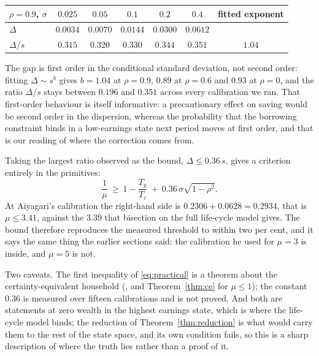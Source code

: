 \begingroup\small
\begin{center}
\begin{tabular}{@{}lcccccc@{}}
\toprule
$\rho=0.9$, $\sigma$ & $0.025$ & $0.05$ & $0.1$ & $0.2$ & $0.4$ & fitted exponent\\
\midrule
$\Delta$ & $0.0034$ & $0.0070$ & $0.0144$ & $0.0300$ & $0.0612$ & \\
$\Delta/s$ & $0.315$ & $0.320$ & $0.330$ & $0.344$ & $0.351$ & $1.04$\\
\bottomrule
\end{tabular}
\end{center}
\endgroup

The gap is first order in the conditional standard deviation, not second order: fitting
$\Delta\sim s^{b}$ gives $b=1.04$ at $\rho=0.9$, $0.89$ at $\rho=0.6$ and $0.93$ at $\rho=0$, and
the ratio $\Delta/s$ stays between $0.196$ and $0.351$ across every calibration we ran. That
first-order behaviour is itself informative: a precautionary effect on saving would be second
order in the dispersion, whereas the probability that the borrowing constraint binds in a
low-earnings state next period moves at first order, and that is our reading of where the
correction comes from.

Taking the largest ratio observed as the bound, $\Delta\le0.36\,s$, gives a criterion entirely in
the primitives:
\begin{equation}\label{eq:practical}
  \frac1\mu\ \ge\ 1-\frac{T_y}{T_c}\ +\ 0.36\,\sigma\sqrt{1-\rho^2}.
\end{equation}
At Aiyagari's calibration the right-hand side is $0.2306+0.0628=0.2934$, that is $\mu\le3.41$,
against the $3.39$ that bisection on the full life-cycle model gives. The bound therefore
reproduces the measured threshold to within two per cent, and it says the same thing the earlier
sections said: the calibration he used for $\mu=3$ is inside, and $\mu=5$ is not.

Two caveats. The first inequality of \eqref{eq:practical} is a theorem about the
certainty-equivalent household (, and
Theorem~\ref{thm:ce} for $\mu\le1$); the constant $0.36$ is measured over fifteen calibrations and
is not proved. And both are statements at zero wealth in the highest earnings state, which is
where the life-cycle model binds; the reduction of Theorem~\ref{thm:reduction} is what would carry
them to the rest of the state space, and its own condition fails, so this is a sharp description
of where the truth lies rather than a proof of it.

